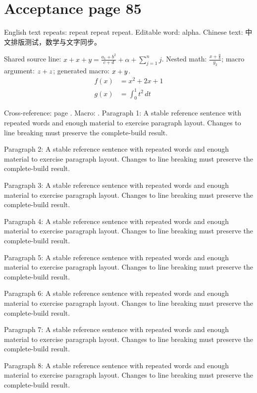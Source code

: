 \section*{Acceptance page 85}
\label{page:85}
English text repeats: repeat repeat repeat. Editable word: alpha.
Chinese text: 中文排版测试，数学与文字同步。\par
Shared source line: $x+x+y=\frac{a_{1}+b^{2}}{c+d}+\alpha+\sum_{j=1}^{n}j$.
Nested math: $\frac{x+\frac{a}{b}}{y_{2}}$; macro argument: $z+z$; generated macro: $x+y$.
\begin{align*}
 f(x)&=x^{2}+2x+1\\
 g(x)&=\int_{0}^{1} t^{2}\,dt
\end{align*}
\par Cross-reference: page \pageref{page:1}. Macro: \globalword.
Paragraph 1: A stable reference sentence with repeated words and enough material to exercise paragraph layout. Changes to line breaking must preserve the complete-build result.\par
Paragraph 2: A stable reference sentence with repeated words and enough material to exercise paragraph layout. Changes to line breaking must preserve the complete-build result.\par
Paragraph 3: A stable reference sentence with repeated words and enough material to exercise paragraph layout. Changes to line breaking must preserve the complete-build result.\par
Paragraph 4: A stable reference sentence with repeated words and enough material to exercise paragraph layout. Changes to line breaking must preserve the complete-build result.\par
Paragraph 5: A stable reference sentence with repeated words and enough material to exercise paragraph layout. Changes to line breaking must preserve the complete-build result.\par
Paragraph 6: A stable reference sentence with repeated words and enough material to exercise paragraph layout. Changes to line breaking must preserve the complete-build result.\par
Paragraph 7: A stable reference sentence with repeated words and enough material to exercise paragraph layout. Changes to line breaking must preserve the complete-build result.\par
Paragraph 8: A stable reference sentence with repeated words and enough material to exercise paragraph layout. Changes to line breaking must preserve the complete-build result.\par
\newpage
